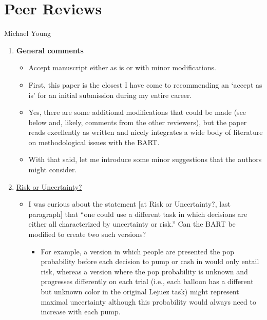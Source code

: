 \documentclass[serif, twocolumn, review]{jote-article}
\begin{document}
\vspace{5\baselineskip}

{}

\newpage

{}
\section*{Peer Reviews}
\label{sec:reviews}

\begin{reviewend}{Michael Young}
    \begin{enumerate}[label=\textbf{\arabic*}), start=0]
    \item \textbf{General comments}
        \begin{itemize}
            \item Accept manuscript either as is or with minor modifications. 
            \item First, this paper is the closest I have come to recommending an `accept as is' for an initial submission during my entire career.  
            \item Yes, there are some additional modifications that could be made (see below and, likely, comments from the other reviewers), but the paper reads excellently as written and nicely integrates a wide body of literature on methodological issues with the BART.  
            \item With that said, let me introduce some minor suggestions that the authors might consider. 
        \end{itemize}

    \item \hyperref[sec:riskp5]{Risk or Uncertainty?}
        \begin{itemize}
            \item I was curious about the statement [at Risk or Uncertainty?, last paragraph] that ``one could use a different task in which decisions are either all characterized by uncertainty or risk.''  Can the BART be modified to create two such versions? 
            \begin{itemize}
                \item For example, a version in which people are presented the pop probability before each decision to pump or cash in would only entail risk, whereas a version where the pop probability is unknown and progresses differently on each trial (i.e., each balloon has a different but unknown color in the original Lejuez task) might represent maximal uncertainty although this probability would always need to increase with each pump.
            \end{itemize}
        \end{itemize}


\end{enumerate}
\end{reviewend}
\end{document}
